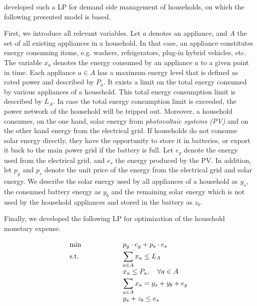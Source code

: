  developed such a LP for demand side management of households, on which the following
presented model is based. 

First, we introduce all relevant variables. Let $a$ denotes an appliance, and $A$ the set of all existing appliances in a household.
In that case, an appliance constitutes energy consuming items, e.g. washers, refrigerators, plug-in hybrid vehicles, etc.
The variable $x_{a}$ denotes the energy consumed by an appliance $a$ to a given point in time. 
Each appliance $a \in A$ has a maximum energy level that is defined as rated power and described by $P_{a}$.
It exists a limit on the total energy consumed by various appliances of a household. This total energy consumption limit is described by $L_{A}$. In case the total energy consumption limit is exceeded, the power network of the household will be tripped out.
Moreover, a household consumes, on the one hand, solar energy from
\textit{photovoltaic systems (PV)} and on the other hand energy from the electrical grid. 
If households do not consume solar energy directly, they have the opportunity to 
store it in batteries, or export it back to the main power grid if the battery is full.
Let $e_{g}$ denote the energy used from the electrical grid, and $e_{s}$ the energy produced by the PV.
In addition, let $p_{g}$ and $p_{s}$ denote the unit price of the energy from the electrical grid and solar energy.
We describe the solar energy used by all appliances of a household as $y_{s}$, the consumed battery energy 
as $y_{b}$ and the remaining solar energy which is not used by the household appliances and stored in the battery as $z_{b}$.

Finally, we developed the following LP for optimization of the household monetary expense.

\begin{equation}
 \begin{array}{ll@{}ll}
 \text{min} & \displaystyle p_{g} \cdot e_{g} + p_{s} \cdot e_{s} &\\
 \text{s.t.}& \displaystyle \sum\limits_{a \in A}^{} x_{a} \leq L_{A} \\
                    & \displaystyle x_{a} \leq P_{a}, \quad \forall a \in A \\
                    & \displaystyle \sum\limits_{a \in A}^{} x_{a} = y_{s} + y_{b} + e_{g} \\
                    & \displaystyle y_{s} + z_{b} \leq e_{s}
 \end{array}
\end{equation}

